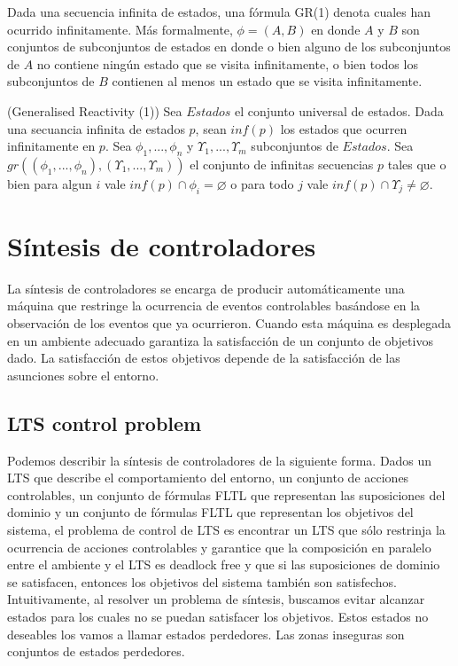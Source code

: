 Dada una secuencia infinita de estados, una fórmula GR(1) \cite{SRD} denota cuales han ocurrido infinitamente. 
Más formalmente, $\phi = (A, B)$ en donde $A$ y $B$ son conjuntos de subconjuntos de estados en donde o bien alguno de los 
subconjuntos de $A$ no contiene ningún estado que se visita infinitamente, o bien todos los subconjuntos de $B$ contienen 
al menos un estado que se visita infinitamente.

\begin{definition}{(Generalised Reactivity (1))}
Sea $Estados$ el conjunto universal de estados. Dada una secuancia infinita de estados $p$, sean $inf(p)$ los estados que 
ocurren infinitamente en $p$. Sea $\phi_{1}, ..., \phi_{n}$ y $\varUpsilon_{1}, ..., \varUpsilon_{m}$ subconjuntos de $Estados$. Sea\\ 
$gr((\phi_{1}, ..., \phi_{n}), (\varUpsilon_{1}, ..., \varUpsilon_{m}))$ el conjunto de infinitas secuencias $p$ tales que 
o bien para algun $i$ vale $inf(p)\cap\phi_{i} = \varnothing$ o para todo $j$ vale $inf(p)\cap\varUpsilon_{j} \neq \varnothing$.
\end{definition}

\section{Síntesis de controladores}

La síntesis de controladores se encarga de producir automáticamente una máquina que restringe la ocurrencia de eventos 
controlables basándose en la observación de los eventos que ya ocurrieron. Cuando esta máquina es desplegada en un ambiente 
adecuado garantiza la satisfacción de un conjunto de objetivos dado. La satisfacción de estos objetivos depende de la 
satisfacción de las asunciones sobre el entorno.

\subsection{LTS control problem}

Podemos describir la síntesis de controladores de la siguiente forma. Dados un LTS que describe el comportamiento 
del entorno, un conjunto de acciones controlables, un conjunto de fórmulas FLTL que representan las suposiciones 
del dominio y un conjunto de fórmulas FLTL que representan los objetivos del sistema, el problema de control de 
LTS \cite{LTSControl} es encontrar un LTS que sólo restrinja la ocurrencia de acciones controlables y garantice que la composición 
en paralelo entre el ambiente y el LTS es deadlock free y que si las suposiciones de dominio se satisfacen, entonces 
los objetivos del sistema también son satisfechos. Intuitivamente, al resolver un problema de síntesis, buscamos evitar alcanzar 
estados para los cuales no se puedan satisfacer los objetivos. Estos estados no deseables los vamos a llamar estados perdedores. 
Las zonas inseguras son conjuntos de estados perdedores.

